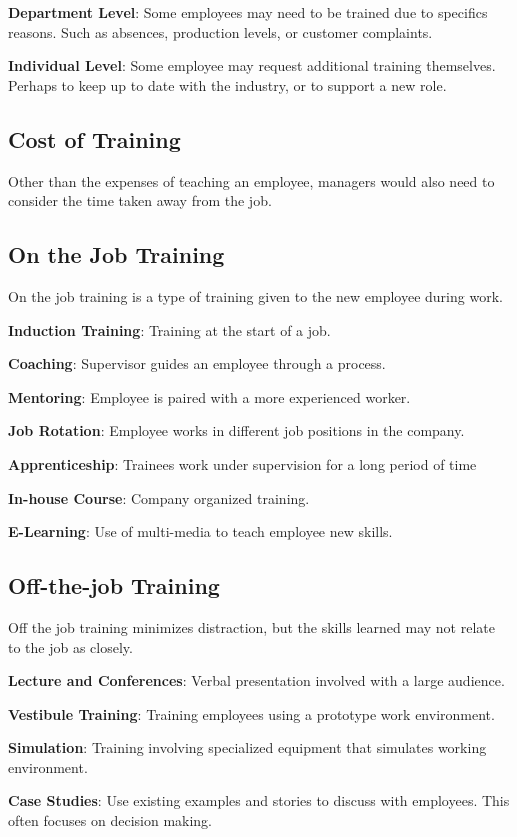 \documentclass{standalone}
\begin{document}
\textbf{Department Level}: Some employees may need to be trained due to specifics reasons. 
Such as absences, production levels, or customer complaints.

\textbf{Individual Level}: Some employee may request additional training themselves.
Perhaps to keep up to date with the industry, or to support a new role.

\subsection{Cost of Training}
Other than the expenses of teaching an employee, managers would also need to consider the time taken away from the job.

\subsection{On the Job Training}
On the job training is a type of training given to the new employee during work.

\textbf{Induction Training}: Training at the start of a job.

\textbf{Coaching}: Supervisor guides an employee through a process.

\textbf{Mentoring}: Employee is paired with a more experienced worker.

\textbf{Job Rotation}: Employee works in different job positions in the company.

\textbf{Apprenticeship}: Trainees work under supervision for a long period of time

\textbf{In-house Course}: Company organized training.

\textbf{E-Learning}: Use of multi-media to teach employee new skills.

\subsection{Off-the-job Training}
Off the job training minimizes distraction, but the skills learned may not relate to the job as closely.

\textbf{Lecture and Conferences}: Verbal presentation involved with a large audience.

\textbf{Vestibule Training}: Training employees using a prototype work environment.

\textbf{Simulation}: Training involving specialized equipment that simulates working environment.

\textbf{Case Studies}: Use existing examples and stories to discuss with employees.
This often focuses on decision making.
\end{document}
